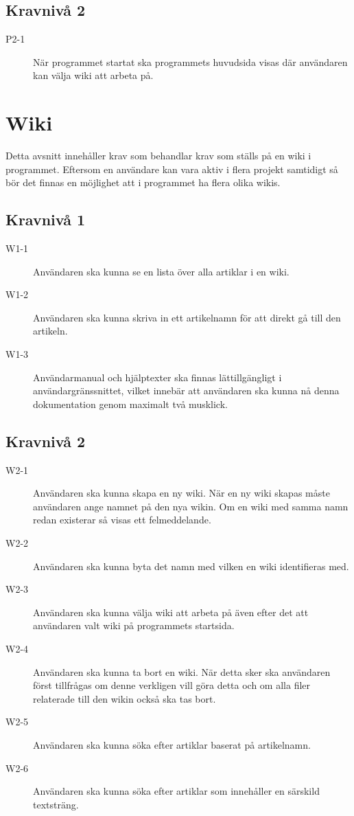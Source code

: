 \subsection{Kravnivå 2}
\begin{description}
\item[P2-1] När programmet startat ska programmets huvudsida visas där användaren kan välja wiki att arbeta på. 
\end{description}

\section{Wiki}
Detta avsnitt innehåller krav som behandlar krav som ställs på en wiki i programmet. Eftersom en användare kan vara aktiv i flera projekt samtidigt så bör det finnas en möjlighet att i programmet ha flera olika wikis.

\subsection{Kravnivå 1}
\begin{description}
\item[W1-1] Användaren ska kunna se en lista över alla artiklar i en wiki.
\item[W1-2] Användaren ska kunna skriva in ett artikelnamn för att direkt gå till den artikeln.
\item[W1-3] Användarmanual och hjälptexter ska finnas lättillgängligt i användargränssnittet, vilket innebär att användaren ska kunna nå denna dokumentation genom maximalt två musklick.
\end{description}

\subsection{Kravnivå 2}
\begin{description}
\item[W2-1] Användaren ska kunna skapa en ny wiki. När en ny wiki skapas måste användaren ange namnet på den nya wikin. Om en wiki med samma namn redan existerar så visas ett felmeddelande.
\item[W2-2] Användaren ska kunna byta det namn med vilken en wiki identifieras med.
\item[W2-3] Användaren ska kunna välja wiki att arbeta på även efter det att användaren valt wiki på programmets startsida.
\item[W2-4] Användaren ska kunna ta bort en wiki. När detta sker ska användaren först tillfrågas om denne verkligen vill göra detta och om alla filer relaterade till den wikin också ska tas bort.
\item[W2-5] Användaren ska kunna söka efter artiklar baserat på artikelnamn.
\item[W2-6] Användaren ska kunna söka efter artiklar som innehåller en särskild textsträng.
\end{description}

